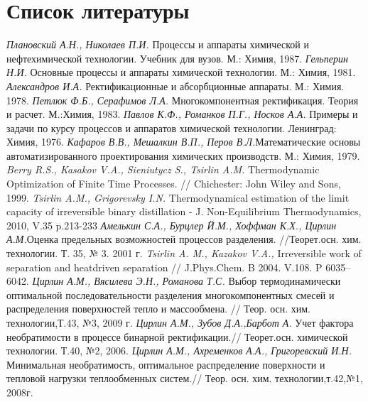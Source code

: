 \documentclass{article}
\begin{document}
	\section*{Список литературы}
\begin{enumerate}
{\it Плановский А.Н., Николаев П.И.} Процессы и аппараты химической
и нефтехимической технологии. Учебник для вузов. М.: Химия, 1987.
{\it Гельперин Н.И.} Основные процессы и аппараты химической технологии. М.:
Химия, 1981.
{\it Александров И.А.} Ректификационные и абсорбционные аппараты. М.: Химия. 1978.
{\it Петлюк Ф.Б., Серафимов Л.А.} Многокомпонентная ректификация. Теория и расчет. М.:Химия, 1983.
{\it Павлов К.Ф., Романков П.Г., Носков А.А.} Примеры и
задачи по курсу процессов и аппаратов химической технологии.
Ленинград: Химия, 1976.
{\it  Кафаров В.В., Мешалкин В.П., Перов В.Л.}Математические основы автоматизированного проектирования химических производств. М.: Химия, 1979. 
{\it Berry R.S., Kasakov V.A., Sieniutycz S., Tsirlin A.M.} Thermodynamic Optimization of Finite Time Processes. // Chichester: John Wiley and Sons, 1999.
{\it Tsirlin A.M., Grigorevsky I.N.} Thermodynamical estimation of the limit capacity of irreversible binary distillation -  J. Non-Equilibrium Thermodynamics, 2010, V.35 p.213-233
{\it Амелькин С.А., Бурцлер Й.М., Хоффман К.Х., Цирлин А.М.}Оценка 
предельных возможностей процессов разделения. //Теорет.осн. хим. 
технологии. Т. 35, № 3. 2001 г.
{\it Tsirlin A. M., Kazakov V.A.,} Irreversible work of separation and heatdriven separation // J.Phys.Chem. B 2004. V.108. P 6035--6042.
{\it Цирлин А.М., Вясилева Э.Н., Романова Т.С.} Выбор  термодинамически оптимальной последовательности разделения многокомпонентных смесей и распределения поверхностей тепло и массообмена. // Теор. осн. хим. технологии,Т.43, №3, 2009 г.
{\it Цирлин А.М., Зубов Д.А.,Барбот А.} Учет фактора необратимости в процессе бинарной ректификации.// Теорет.осн. химической технологии. Т.40, №2, 2006.
{\it Цирлин А.М., Ахременков А.А., Григоревский И.Н.} Минимальная необратимость, оптимальное распределение поверхности и тепловой нагрузки теплообменных систем.// Теор. осн. хим. технологии,т.42,№1, 2008г.
\end{enumerate}
\end{document}
